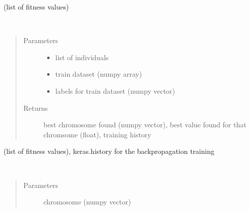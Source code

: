 \documentclass[letterpaper,10pt,english]{sphinxmanual}
\begin{document}
\begin{fulllineitems}
\begin{fulllineitems}
\begin{quote}
\begin{description}
\end{description}\end{quote}

(list of fitness values)

\end{fulllineitems}


\begin{fulllineitems}
\label{\detokenize{index:genetic_optimizer.GeneticNeuralOptimizer.fitness}}~\begin{quote}\begin{description}
\item[{Parameters}] \leavevmode\begin{itemize}
\item {} 
 \textendash{} list of individuals

\item {} 
 \textendash{} train dataset (numpy array)

\item {} 
 \textendash{} labels for train dataset (numpy vector)

\end{itemize}

\item[{Returns}] \leavevmode
best chromosome found (numpy vector), best value found for that chromsome (float), training history

\end{description}\end{quote}

(list of fitness values), keras.history for the backpropagation training

\end{fulllineitems}


\begin{fulllineitems}
\label{\detokenize{index:genetic_optimizer.GeneticNeuralOptimizer.transform_weights}}~\begin{quote}\begin{description}
\item[{Parameters}] \leavevmode
{} \textendash{} chromosome (numpy vector)


\end{description}
\end{quote}
\end{fulllineitems}
\end{fulllineitems}
\end{document}
